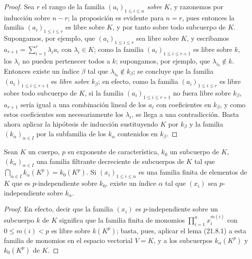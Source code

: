\begin{proof}
Sea $r$ el rango de la familia $(a_i)_{1\leqslant i\leqslant n}$ \emph{sobre} $K$, y
razonemos por inducción sobre $n-r$; la proposición es evidente para $n=r$,
pues entonces la familia $(a_i)_{1\leqslant i\leqslant r}$ es libre sobre $K$, y
por tanto sobre todo subcuerpo de $K$. Supongamos, por ejemplo, que
$(a_i)_{1\leqslant i\leqslant r}$ sea libre sobre $K$, y escribamos
$a_{r+1}=\sum_{i=1}^r\lambda_i a_i$ con $\lambda_i\in K$; como la familia
$(a_i)_{1\leqslant i\leqslant r+1}$ es libre sobre $k$, los $\lambda_i$ no
pueden pertenecer todos a $k$; supongamos, por ejemplo, que
$\lambda_{i_0}\notin k$. Entonces existe un índice $\beta$ tal que
$\lambda_{i_0}\notin k_\beta$; se concluye que la familia
$(a_i)_{1\leqslant i\leqslant r+1}$ es \emph{libre sobre} $k_\beta$; en efecto, como la
familia $(a_i)_{1\leqslant i\leqslant r}$ es libre sobre todo subcuerpo de
$K$, si la familia $(a_i)_{1\leqslant i\leqslant r+1}$ no fuera libre sobre
$k_\beta$, $a_{r+1}$ sería igual a una combinación lineal de los $a_i$ con
coeficientes en $k_\beta$, y como estos coeficientes son necesariamente los
$\lambda_i$, se llega a una contradicción. Basta ahora aplicar la hipótesis de
inducción sustituyendo $K$ por $k_\beta$ y la familia $(k_\alpha)_{\alpha\in I}$
por la subfamilia de los $k_\alpha$ contenidos en $k_\beta$.
\end{proof}

\begin{lemma}[21.8.2]
\label{0.21.8.2-fr}
Sean $K$ un cuerpo, $p$ su exponente de característica, $k_0$ un subcuerpo de
$K$, $(k_\alpha)_{\alpha\in I}$ una familia filtrante decreciente de
subcuerpos de $K$ tal que $\bigcap_{\alpha\in I}k_\alpha(K^p)=k_0(K^p)$.
Si $(x_i)_{1\leqslant i\leqslant n}$ es una familia finita de elementos de $K$
que es $p$-independiente sobre $k_0$, existe un índice $\alpha$ tal que $(x_i)$ sea
$p$-independiente sobre $k_\alpha$.
\end{lemma}

\begin{proof}
En efecto, decir que la familia $(x_i)$ es $p$-independiente sobre un subcuerpo $k$
de $K$ significa que la familia finita de monomios
$\prod_{i=1}^n x_i^{m(i)}$ con $0\leqslant m(i)<p$ es libre sobre $k(K^p)$;
basta, pues, aplicar el lema (21.8.1) a esta familia de monomios en el
espacio vectorial $V=K$, y a los subcuerpos $k_\alpha(K^p)$ y $k_0(K^p)$
de $K$.
\end{proof}

